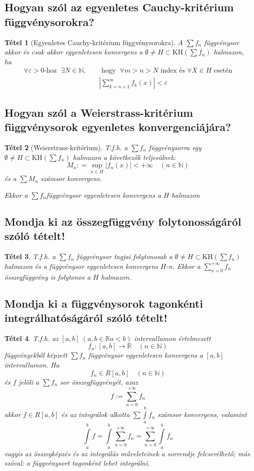 \documentclass[12pt,a4paper]{article}
\newcommand{\R}{\mathbb{R}}
\newcommand{\N}{\mathbb{N}}
\newcommand{\fn}{f_n}
\newcommand{\KH}[1]{\text{KH}(#1)}
\newcommand{\bb}[1]{\left( #1 \right)}
\newcommand{\abs}[1]{\left| #1 \right|}
\newcommand{\boxes}[1]{\left[ #1 \right]}
\newtheorem{tet}{Tétel}[section]
\begin{document}
\subsection{Hogyan szól az egyenletes Cauchy-kritérium függvénysorokra?}
\begin{tet}[Egyenletes Cauchy-kritérium függvénysorokra]
A $\sum\fn$ függvénysor akkor és csak akkor egyenletesen konvergens a $\emptyset \neq H \subset \KH{ \sum\fn }$ halmazon, ha
\begin{align*}
\forall \varepsilon > 0\text{-hoz }\; \exists N \in \N, \quad &\text{ hogy }\; \forall m > n >N \text{ index és } \forall X \in H \text{ esetén} \\
&\abs{\sum\limits_{k=n+1}^m f_k(x)} < \varepsilon
\end{align*}
\end{tet}

\subsection{Hogyan szól a Weierstrass-kritérium függvénysorok egyenletes konvergenciájára?}
\begin{tet}[Weierstrass-kritérium]
T.f.h. a $\sum\fn$ függvénysorra egy $\emptyset \neq H \subset \KH{ \sum\fn }$ halmazon a következők teljesülnek:
\[
M_n : = \sup\limits_{x\in H} \abs{\fn(x)} < + \infty \quad \bb{n \in \N}
\]
és a $\sum M_n$ számsor konvergens.

Ekkor a $\sum\fn$függvénysor egyenletesen konvergens a $H$ halmazon
\end{tet}

\subsection{Mondja ki az összegfüggvény folytonosságáról szóló tételt!}
\begin{tet}
T.f.h. a $\sum\fn$ függvénysor tagjai folytonosak a $\emptyset \neq H \subset \KH{ \sum\fn }$ halmazon és a függvénysor egyenletesen konvergens $H$-n. Ekkor a $\sum\limits_{n=0}^{+\infty}\fn$ összegfüggvény is folytonos a $H$ halmazon. 
\end{tet}
\subsection{Mondja ki a függvénysorok tagonkénti integrálhatóságáról szóló tételt!}
\begin{tet}
T.f.h. az $\boxes{a,b} \; \bb{a,b \in \R a < b}$ intervallumon értelmezett
\[
\fn : \boxes{a,b} \to \R \quad \bb{n\in \N}
\]
függvényekből képzett $\sum\fn$ függvénysor egyenletesen konvergens a $\boxes{a,b}$ intervallumon. Ha
\[
\fn \in R\boxes{a,b} \quad \bb{n\in\N}
\]
és $f$ jelöli a $\sum\fn$ sor összegfüggvényét, azaz 
\[
f := \sum\limits_{n=0}^{+\infty}\fn
\] 
akkor $f\in R\boxes{a,b}$ és az integrálok alkotta $\sum\int\limits_a^b\fn$ számsor konvergens,
valamint
\[
\int\limits_a^b f = \int\limits_a^b \sum\limits_{n=0}^{+\infty} \fn = \sum\limits_{n=0}^{+\infty}\int\limits_a^b\fn
\]
vagyis az összegképzés és az integrálás műveleteinek a sorrendje felcserélhető;
más szóval: a függvénysort tagonként lehet integrálni.
\end{tet}
\end{document}
